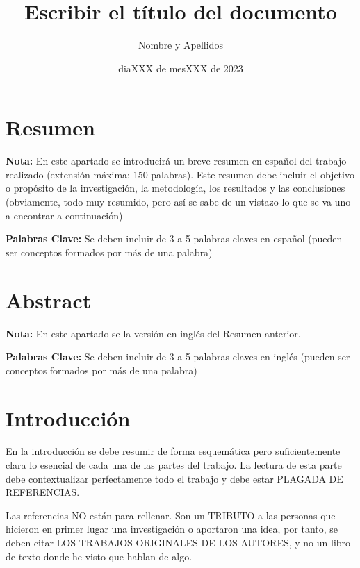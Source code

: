 \documentclass[11pt,a4paper,spanish]{book}
\title{Escribir el título del documento}
\author{Nombre y Apellidos}
\date{diaXXX de mesXXX de 2023}
\begin{document}
\renewcommand{\listfigurename}{Índice de figuras}
\renewcommand{\listtablename}{Índice de tablas}
\renewcommand{\contentsname}{Índice de contenidos}
\renewcommand{\figurename}{Figura}
\renewcommand{\tablename}{Tabla} 

\maketitle

\frontmatter
\tableofcontents
\listoffigures
\listoftables

\chapter{Resumen}
{\bf Nota:} En este apartado se introducirá un breve resumen en español del trabajo realizado (extensión máxima: 150 palabras). Este resumen debe incluir el objetivo o propósito de la investigación, la metodología, los resultados y las conclusiones (obviamente, todo muy resumido, pero así se sabe de un vistazo lo que se va uno a encontrar a continuación)


{\bf Palabras Clave:} Se deben incluir de 3 a 5 palabras claves en español (pueden ser conceptos formados por más de una palabra)

\chapter{Abstract}
{\bf Nota:} En este apartado se la versión en inglés del Resumen anterior.


{\bf Palabras Clave:} Se deben incluir de 3 a 5 palabras claves en inglés  (pueden ser conceptos formados por más de una palabra)




\mainmatter
\chapter{Introducción}

En la introducción se debe resumir de forma esquemática pero suficientemente clara lo esencial de cada una de las partes del trabajo. La lectura de esta parte debe contextualizar perfectamente todo el trabajo y debe estar PLAGADA DE REFERENCIAS.

Las referencias NO están para rellenar. Son un TRIBUTO a las personas que hicieron en primer lugar una investigación o aportaron una idea, por tanto, se deben citar LOS TRABAJOS ORIGINALES DE LOS AUTORES, y no un libro de texto donde he visto que hablan de algo.
\end{document}
